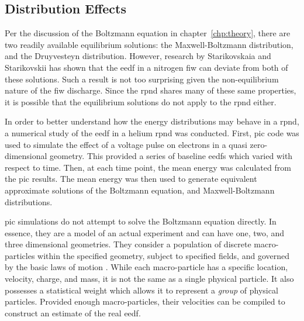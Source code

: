 \subsection{Distribution Effects}

Per the discussion of the Boltzmann equation in chapter~\ref{chp:theory}, there
are two readily available equilibrium solutions: the Maxwell-Boltzmann
distribution, and the Druyvesteyn distribution. However, research by
Starikovskaia and Starikovskii \cite{Starikovskaia2001} has shown that the
\acs{eedf} in a nitrogen \acs{fiw} can deviate from both of these solutions.
Such a result is not too surprising given the non-equilibrium nature of the
\acs{fiw} discharge. Since the \acs{rpnd} shares many of these same properties,
it is possible that the equilibrium solutions do not apply to the \acs{rpnd}
either.

In order to better understand how the energy distributions may behave in a
\acs{rpnd}, a numerical study of the \acs{eedf} in a helium \acs{rpnd} was
conducted. First, \acs{pic} code was used to simulate the effect of a voltage
pulse on electrons in a quasi zero-dimensional geometry. This provided a series
of baseline \acs{eedf}s which varied with respect to time. Then, at each time
point, the mean energy was calculated from the \acs{pic} results. The mean
energy was then used to generate equivalent approximate solutions of the
Boltzmann equation, and Maxwell-Boltzmann distributions.

\acs{pic} simulations do not attempt to solve the Boltzmann equation directly.
In essence, they are a model of an actual experiment and can have one, two, and
three dimensional geometries. They consider a population of discrete
macro-particles within the specified geometry, subject to specified fields, and
governed by the basic laws of motion \cite{Birdsall1991}. While each
macro-particle has a specific location, velocity, charge, and mass, it is not
the same as a single physical particle. It also possesses a statistical weight
which allows it to represent a \emph{group} of physical particles. Provided
enough macro-particles, their velocities can be compiled to construct an
estimate of the real \acs{eedf}.

